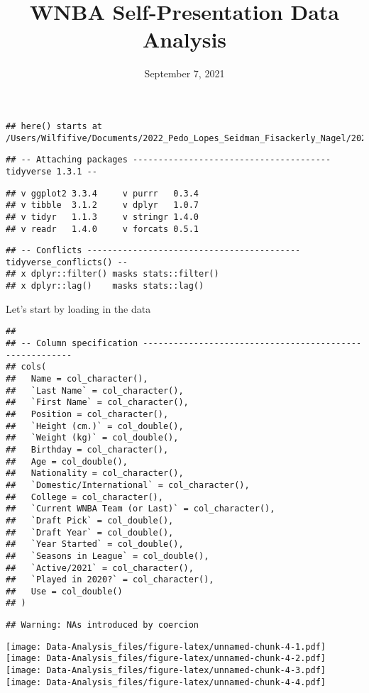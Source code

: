 \documentclass[
]{article}
\title{WNBA Self-Presentation Data Analysis}
\author{}
\date{\vspace{-2.5em}September 7, 2021}
\begin{document}
\maketitle

\begin{verbatim}
## here() starts at /Users/Wilfifive/Documents/2022_Pedo_Lopes_Seidman_Fisackerly_Nagel/2022_Pedo_Lopes_Seidman_Fisackerly_Nagel
\end{verbatim}

\begin{verbatim}
## -- Attaching packages --------------------------------------- tidyverse 1.3.1 --
\end{verbatim}

\begin{verbatim}
## v ggplot2 3.3.4     v purrr   0.3.4
## v tibble  3.1.2     v dplyr   1.0.7
## v tidyr   1.1.3     v stringr 1.4.0
## v readr   1.4.0     v forcats 0.5.1
\end{verbatim}

\begin{verbatim}
## -- Conflicts ------------------------------------------ tidyverse_conflicts() --
## x dplyr::filter() masks stats::filter()
## x dplyr::lag()    masks stats::lag()
\end{verbatim}

Let's start by loading in the data

\begin{verbatim}
## 
## -- Column specification --------------------------------------------------------
## cols(
##   Name = col_character(),
##   `Last Name` = col_character(),
##   `First Name` = col_character(),
##   Position = col_character(),
##   `Height (cm.)` = col_double(),
##   `Weight (kg)` = col_double(),
##   Birthday = col_character(),
##   Age = col_double(),
##   Nationality = col_character(),
##   `Domestic/International` = col_character(),
##   College = col_character(),
##   `Current WNBA Team (or Last)` = col_character(),
##   `Draft Pick` = col_double(),
##   `Draft Year` = col_double(),
##   `Year Started` = col_double(),
##   `Seasons in League` = col_double(),
##   `Active/2021` = col_character(),
##   `Played in 2020?` = col_character(),
##   Use = col_double()
## )
\end{verbatim}

\begin{verbatim}
## Warning: NAs introduced by coercion
\end{verbatim}

\texttt{[image: Data-Analysis\_files/figure-latex/unnamed-chunk-4-1.pdf]}
\texttt{[image: Data-Analysis\_files/figure-latex/unnamed-chunk-4-2.pdf]}
\texttt{[image: Data-Analysis\_files/figure-latex/unnamed-chunk-4-3.pdf]}
\texttt{[image: Data-Analysis\_files/figure-latex/unnamed-chunk-4-4.pdf]}
\end{document}
